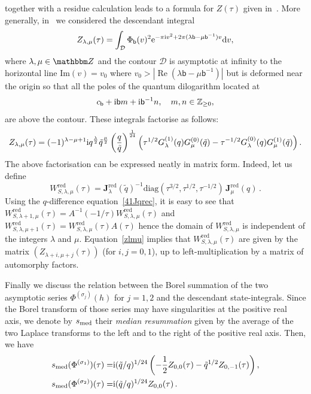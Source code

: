\documentclass[12pt,reqno]{amsart}
\theoremstyle{definition}
\def\BZ{\mathbbm Z}
\def\IZ{\mathbb{Z}}
\def\calD{\mathcal D}
\def\tq{\tilde{q}}
\def\be{\begin{equation}}
\def\ee{\end{equation}}
\def\bb{\mathsf{b}}
\def\ri{\mathrm{i}}
\def\rd{\mathrm{d}}
\def\re{{\rm e}}
\def\ri{{\rm i}}
\def\rd{{\rm d}}
\def\Im{\mathrm{Im}}
\def\diag{\mathrm{diag}}
\def\bJ{\mathbf J}
\def\RED{\mathrm{red}}
\def\IZ{\mathbb{Z}}
\DeclareMathOperator{\real}{Re}
\begin{document}
together with a residue calculation leads to a formula for $Z(\tau)$ given
in~\cite{GK:evaluation}. More generally, in~\cite{GGM:resurgent} we considered the descendant
integral
%
\begin{equation}
\label{eq.statelm}
 Z_{\lambda,\mu}(\tau) =
    \int_{\calD} \Phi_{\bb}(v)^2 \re^{-\pi\ri v^2 +
      2\pi(\lambda \bb - \mu \bb^{-1})v}\rd v,
\end{equation}
%
where $\lambda, \mu \in \BZ$ and the contour $\calD$ is asymptotic at
infinity to the horizontal line $\Im(v)=v_0$ where
$v_0 > |\real(\lambda\bb-\mu\bb^{-1})|$ but is deformed near the
origin so that all the poles of the quantum dilogarithm located at
\begin{equation}
  c_\bb + \ri \bb m +\ri \bb^{-1}n,\quad m,n\in\IZ_{\geq 0},
\end{equation}
are above the contour. 
%
These integrals factorise as follows:
%
\be
\label{zlmu}
 Z_{\lambda,\mu}(\tau)    =
    (-1)^{\lambda-\mu+1}\ri q^{\frac{\lambda}{2}}\tq^{\frac{\mu}{2}}
    \left(\frac{q}{\tq}\right)^{\frac{1}{24}}
    \left(\tau^{1/2}G^{(1)}_\lambda(q)G^{(0)}_\mu(\tq) -
     \tau^{-1/2} G^{(0)}_\lambda(q)G^{(1)}_\mu(\tq)\right). 
\ee
The above factorisation can be expressed neatly in matrix form. Indeed, let
us define 
\be
\label{Wgtred}
W^\RED_{S,\lambda,\mu}(\tau) = \bJ^\RED_\lambda(\tq)^{-1}
\diag(\tau^{3/2}, \tau^{1/2}, \tau^{-1/2}) \, \bJ^\RED_\mu(q) \,.
\ee
Using the $q$-difference equation~\eqref{41Jqrec}, it is easy to see that
$W^\RED_{S,\lambda+1,\mu}(\tau)=A^{-1}(-1/\tau) W^\RED_{S,\lambda,\mu}(\tau)$
and $W^\RED_{S,\lambda,\mu+1}(\tau)=W^\RED_{S,\lambda,\mu}(\tau) A(\tau)$ hence
the domain of $W^\RED_{S,\lambda,\mu}$ is independent of the integers $\lambda$
and $\mu$. Equation~\eqref{zlmu} implies that 
$W^\RED_{S,\lambda,\mu}(\tau)$ are given by the matrix $(Z_{\lambda+i,\mu+j}(\tau))$
(for $i,j =0,1$), up to left-multiplication by a matrix of automorphy factors.

Finally we discuss the relation between the Borel summation of the two
asymptotic series $\Phi^{(\sigma_j)}(h)$ for $j=1,2$ and the
descendant state-integrals. Since the Borel transform of those series
may have singularities at the positive real axis, we denote by
$s_{\rm med}$ their \emph{median resummation} given by the average of
the two Laplace transforms to the left and to the right of the
positive real axis. Then, we have
\begin{equation}
  \label{smed12}
  \begin{aligned}
    s_{\rm med} ( \Phi^{(\sigma_1)} ) (\tau) = &\ri(\tq/q)^{1/24}
    \left(-\frac{1}{2}Z_{0,0}(\tau)-\tq^{1/2}
      Z_{0,-1}(\tau)\right), \\
    s_{\rm med} ( \Phi^{(\sigma_2)} ) (\tau) = &\ri(\tq/q)^{1/24}
    Z_{0,0}(\tau) \,.
  \end{aligned}
\end{equation}
\end{document}
